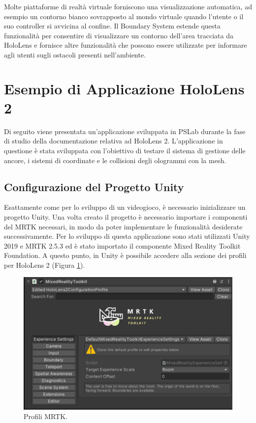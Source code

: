 Molte piattaforme di realtà virtuale forniscono una visualizzazione automatica, ad esempio un contorno bianco sovrapposto al mondo virtuale quando l'utente o il suo controller si avvicina al confine. Il Boundary System estende questa funzionalità per consentire di visualizzare un contorno dell'area tracciata da HoloLens e fornisce altre funzionalità che possono essere utilizzate per informare agli utenti sugli ostacoli presenti nell'ambiente. 

\section{Esempio di Applicazione HoloLens 2}\label{sec:Sezione2.4}
Di seguito viene presentata un'applicazione sviluppata in PSLab durante la fase di studio della documentazione relativa ad HoloLens 2.
L'applicazione in questione è stata sviluppata con l'obiettivo di testare il sistema di gestione delle ancore, i sistemi di coordinate e le collisioni degli ologrammi con la mesh.

\subsection{Configurazione del Progetto Unity}
Esattamente come per lo sviluppo di un videogioco, è necessario inizializzare un progetto Unity.
Una volta creato il progetto è necessario importare i componenti del MRTK necessari, in modo da poter implementare le funzionalità desiderate successivamente.
Per lo sviluppo di questa applicazione sono stati utilizzati Unity 2019 e MRTK 2.5.3 ed è stato importato il componente Mixed Reality Toolkit Foundation.
A questo punto, in Unity è possibile accedere alla sezione dei profili per HoloLens 2 (Figura \ref{fig:figure25}).

\begin{figure}[t]
    \centering
    \includegraphics[width=\textwidth]{images/MRTK-profiles.png}
    \caption{Profili MRTK.}
    \label{fig:figure25}
\end{figure}

